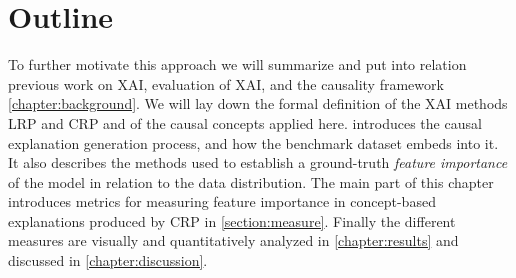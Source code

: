 \section{Outline}
To further motivate this approach we will summarize and put into relation previous work on XAI, evaluation of XAI, and the causality framework \cref{chapter:background}. We will lay down the formal definition of the XAI methods LRP and CRP and of the causal concepts applied here.
 introduces the causal explanation generation process, and how the benchmark dataset embeds into it. It also describes the methods used to establish a ground-truth \textit{feature importance} of the model in relation to the data distribution. 
The main part of this chapter introduces metrics for measuring feature importance in concept-based explanations produced by CRP in \cref{section:measure}. Finally the different measures are visually and quantitatively analyzed in \cref{chapter:results} and discussed in \cref{chapter:discussion}.

